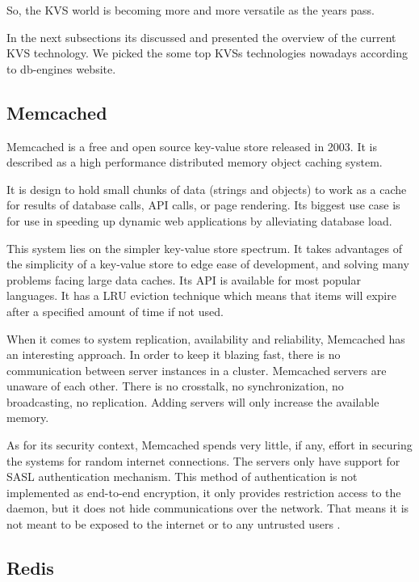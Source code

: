 So, the \gls{KVS} world is becoming more and more versatile as the years pass.

In the next subsections its discussed and presented the overview of the current \gls{KVS} technology. We picked the some top KVSs technologies nowadays according to db-engines \cite{db-engine:2} website.

\subsection{Memcached} %
\label{ssec:memcached}

Memcached \cite{memcached:1} is a free and open source key-value store released in 2003. It is described as a high performance distributed memory object caching system.

It is design to hold small chunks of data (strings and objects) to work as a cache for results of database calls, API calls, or page rendering. Its biggest use case is for use in speeding up dynamic web applications by alleviating database load.

This system lies on the simpler key-value store spectrum. It takes advantages of the simplicity of a key-value store to edge ease of development, and solving many problems facing large data caches. Its API is available for most popular languages. It has a \gls{LRU} eviction technique which means that items will expire after a specified amount of time if not used. 

When it comes to system replication, availability and reliability, Memcached has an interesting approach. In order to keep it blazing fast, there is no communication between server instances in a cluster. Memcached servers are unaware of each other. There is no crosstalk, no synchronization, no broadcasting, no replication. Adding servers will only increase the available memory.

As for its security context, Memcached spends very little, if any, effort in securing the systems for random internet connections. The servers only have support for SASL \cite{sasl:1} authentication mechanism. This method of authentication is not implemented as end-to-end encryption, it only provides restriction access to the daemon, but it does not hide communications over the network. That means it is not meant to be exposed to the internet or to any untrusted users \cite{memcached:2}.

\subsection{Redis} %
\label{ssec:redis}

